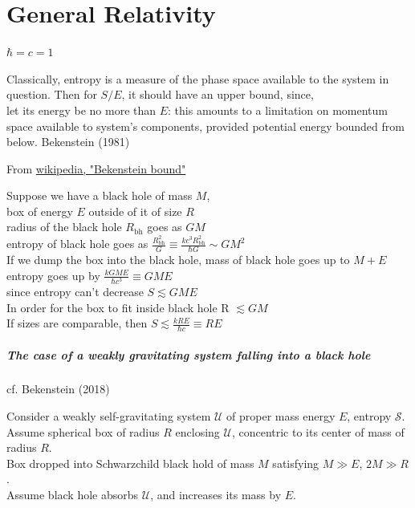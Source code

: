 \part{General Relativity}


$\hbar = c = 1$

Classically, entropy is a measure of the phase space available to the system in question. Then for $S/E$, it should have an upper bound, since, \\
let its energy be no more than $E$: this amounts to a limitation on momentum space available to system's components, provided potential energy bounded from below. Bekenstein (1981) \cite{dgdt:Beke1981}

From \href{https://en.wikipedia.org/wiki/Bekenstein_bound}{wikipedia, "Bekenstein bound"}

Suppose we have a black hole of mass $M$, \\
box of energy $E$ outside of it of size $R$ \\
radius of the black hole $R_{\text{bh}}$ goes as $GM$ \\
entropy of black hole goes as $\frac{ R^2_{\text{bh}} }{ G} \equiv \frac{ kc^3 R^2_{\text{bh}} }{\hbar G} \sim GM^2$ \\

If we dump the box into the black hole, mass of black hole goes up to $M + E$ \\

entropy goes up by $\frac{kGME}{\hbar c^3} \equiv GME$ \\
since entropy can't decrease $S \lesssim GME$ \\
In order for the box to fit inside black hole R $\lesssim GM$ \\
If sizes are comparable, then $S \lesssim \frac{kRE}{\hbar c} \equiv RE$ \\

\subsubsection{The case of a weakly gravitating system falling into a black hole}
cf. Bekenstein (2018) \cite{dgdt:Beke2018}

Consider a weakly self-gravitating system $\mathcal{U}$ of proper mass energy $E$, entropy $\mathcal{S}$. \\
Assume spherical box of radius $R$ enclosing $\mathcal{U}$, concentric to its center of mass of radius $R$. \\
Box dropped into Schwarzchild black hold of mass $M$ satisfying $M\gg E$, $2M \gg R$. \\
Assume black hole absorbs $\mathcal{U}$, and increases its mass by $E$. \\

